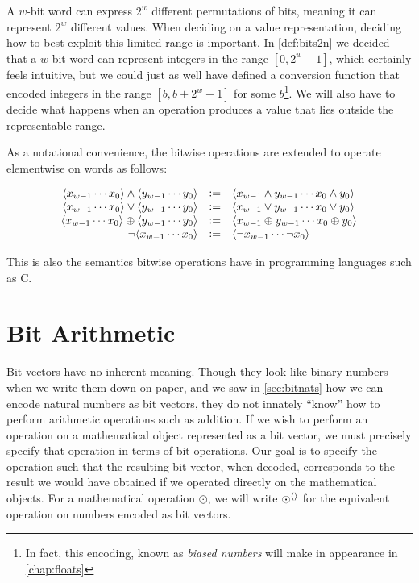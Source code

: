 A $w$-bit word can express $2^{w}$ different permutations of bits,
meaning it can represent $2^{w}$ different values.  When deciding on a
value representation, deciding how to best exploit this limited range
is important.  In \cref{def:bits2n} we decided that a $w$-bit word can
represent integers in the range $[0,2^{w}-1]$, which certainly feels
intuitive, but we could just as well have defined a conversion
function that encoded integers in the range $[b,b+2^{w}-1]$ for some
$b$\footnote{In fact, this encoding, known as \emph{biased numbers}
  will make in appearance in \cref{chap:floats}}.  We will also have
to decide what happens when an operation produces a value that lies
outside the representable range.

As a notational convenience, the bitwise operations are extended to
operate elementwise on words as follows:

\begin{definition}
  \[
    \begin{array}{rcl}
      \langle x_{w-1}\cdots x_{0} \rangle \land \langle y_{w-1}\cdots y_{0} \rangle
      &\vcentcolon=& \langle x_{w-1} \land y_{w-1}\cdots x_{0} \land y_{0} \rangle \\
      \langle x_{w-1}\cdots x_{0} \rangle \lor \langle y_{w-1}\cdots y_{0} \rangle
      &\vcentcolon=& \langle x_{w-1} \lor y_{w-1} \cdots x_{0} \lor y_{0} \rangle \\
      \langle x_{w-1}\cdots x_{0} \rangle \oplus \langle y_{w-1}\cdots y_{0} \rangle
      &\vcentcolon=& \langle x_{w-1} \oplus y_{w-1}\cdots x_{0} \oplus y_{0} \rangle \\
      \neg \langle x_{w-1}\cdots x_{0} \rangle
      &\vcentcolon=& \langle \neg x_{w-1}\cdots \neg x_{0} \rangle
    \end{array}
  \]
  \label{def:wordbitwise}
\end{definition}

This is also the semantics bitwise operations have in programming
languages such as C.

\section{Bit Arithmetic}
\label{sec:bit-arithmetic}

Bit vectors have no inherent meaning.  Though they look like binary
numbers when we write them down on paper, and we saw in
\cref{sec:bitnats} how we can encode natural numbers as bit vectors,
they do not innately ``know'' how to perform arithmetic operations
such as addition.  If we wish to perform an operation on a
mathematical object represented as a bit vector, we must precisely
specify that operation in terms of bit operations.  Our goal is to
specify the operation such that the resulting bit vector, when
decoded, corresponds to the result we would have obtained if we
operated directly on the mathematical objects.  For a mathematical
operation $\odot$, we will write $\operatorname{\odot^{\langle\rangle}}$ for the equivalent
operation on numbers encoded as bit vectors.


